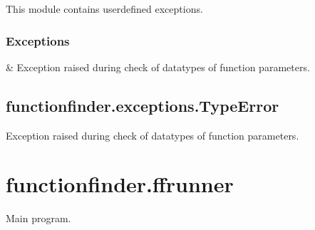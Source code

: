 \documentclass[letterpaper,10pt,english]{sphinxmanual}
\begin{document}
\sphinxAtStartPar
This module contains userdefined exceptions.
\subsubsection*{Exceptions}


\begin{savenotes}\sphinxattablestart
\sphinxthistablewithglobalstyle
\sphinxthistablewithnovlinesstyle
\centering
\begin{tabulary}{\linewidth}[t]{}
\sphinxtoprule
\sphinxtableatstartofbodyhook
\sphinxAtStartPar
{\hyperref[\detokenize{_autosummary/functionfinder.exceptions.TypeError:functionfinder.exceptions.TypeError}]{}}
&
\sphinxAtStartPar
Exception raised during check of datatypes of function parameters.
\\
\sphinxbottomrule
\end{tabulary}
\sphinxtableafterendhook\par
\sphinxattableend\end{savenotes}

\sphinxstepscope


\subsection{functionfinder.exceptions.TypeError}
\label{\detokenize{_autosummary/functionfinder.exceptions.TypeError:functionfinder-exceptions-typeerror}}\label{\detokenize{_autosummary/functionfinder.exceptions.TypeError::doc}}

\begin{fulllineitems}
\label{\detokenize{_autosummary/functionfinder.exceptions.TypeError:functionfinder.exceptions.TypeError}}
\pysigstartsignatures
{}
\pysigstopsignatures
\sphinxAtStartPar
Exception raised during check of datatypes of function parameters.

\end{fulllineitems}


\sphinxstepscope


\section{functionfinder.ffrunner}
\label{\detokenize{_autosummary/functionfinder.ffrunner:module-functionfinder.ffrunner}}\label{\detokenize{_autosummary/functionfinder.ffrunner:functionfinder-ffrunner}}\label{\detokenize{_autosummary/functionfinder.ffrunner::doc}}
\sphinxAtStartPar
Main program.
\end{document}
